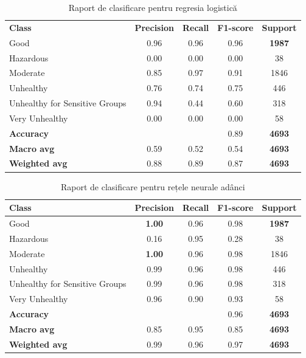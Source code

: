 \documentclass{article}
\begin{document}
\begin{table}[htb]
\centering
\begin{tabular}{lcccc}
\textbf{Class} & \textbf{Precision} & \textbf{Recall} & \textbf{F1-score} & \textbf{Support} \\
Good                             & 0.96 & 0.96 & 0.96 & \textbf{1987} \\
Hazardous                        & 0.00 & 0.00 & 0.00 & 38   \\
Moderate                         & 0.85 & 0.97 & 0.91 & 1846 \\
Unhealthy                        & 0.76 & 0.74 & 0.75 & 446  \\
Unhealthy for Sensitive Groups  & 0.94 & 0.44 & 0.60 & 318  \\
Very Unhealthy                   & 0.00 & 0.00 & 0.00 & 58   \\
\hline
\textbf{Accuracy}               &       &       & 0.89 & \textbf{4693} \\
\textbf{Macro avg}              & 0.59 & 0.52 & 0.54 & \textbf{4693} \\
\textbf{Weighted avg}           & 0.88 & 0.89 & 0.87 & \textbf{4693} \\
\end{tabular}
\caption{Raport de clasificare pentru regresia logistică}
\end{table}

\begin{table}[htb]
\centering
\begin{tabular}{lcccc}
\hline
\textbf{Class} & \textbf{Precision} & \textbf{Recall} & \textbf{F1-score} & \textbf{Support} \\
\hline
Good                               & \textbf{1.00} & 0.96 & 0.98 & \textbf{1987} \\
Hazardous                          & 0.16 & 0.95 & 0.28 & 38   \\
Moderate                           & \textbf{1.00} & 0.96 & 0.98 & 1846 \\
Unhealthy                          & 0.99 & 0.96 & 0.98 & 446  \\
Unhealthy for Sensitive Groups     & 0.99 & 0.96 & 0.98 & 318  \\
Very Unhealthy                     & 0.96 & 0.90 & 0.93 & 58   \\
\hline
\textbf{Accuracy}                 &      &      & 0.96 & \textbf{4693} \\
\textbf{Macro avg}                & 0.85 & 0.95 & 0.85 & \textbf{4693} \\
\textbf{Weighted avg}             & 0.99 & 0.96 & 0.97 & \textbf{4693} \\
\hline
\end{tabular}
\caption{Raport de clasificare pentru rețele neurale adânci}
\end{table}
\end{document}
